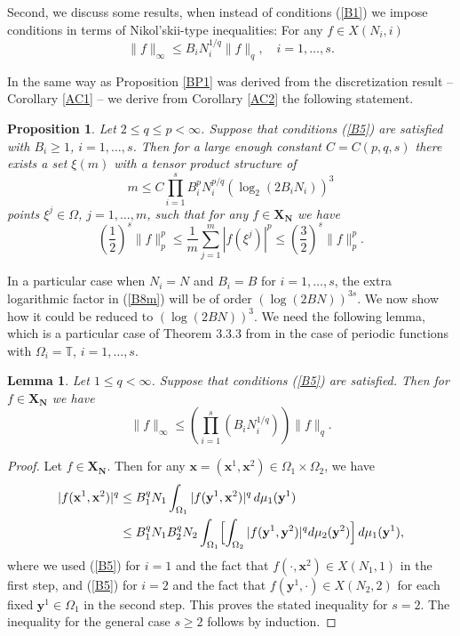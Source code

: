 \documentclass[12pt]{article}
\def \T{\mathbb T}
\def\bx{\mathbf x}
\def\by{\mathbf y}
\def\bN{\mathbf N}
\def\bX{\mathbf X}
\newtheorem{Lemma}{Lemma}[section]
\newtheorem{Proposition}{Proposition}[section]
\numberwithin{equation}{section}
\newcommand{\be}{\begin{equation}}
\newcommand{\ee}{\end{equation}}
\begin{document}
Second, we discuss some results, when instead of conditions (\ref{B1}) we impose conditions in terms of Nikol'skii-type inequalities: For any $f\in X(N_i,i)$
 \be\label{B5}
\|f\|_\infty  \le  B_i N_i^{1/q}\|f\|_q,   \quad i=1,\dots,s.
\ee
 	
In the same way as Proposition \ref{BP1} was derived from the discretization result -- Corollary \ref{AC1} -- we derive from Corollary \ref{AC2} the following statement.

\begin{Proposition}\label{BP2} Let $2\le q \le p<\infty$. Suppose that conditions (\ref{B5}) are satisfied with $B_i\ge 1 $, $i=1,\dots,s$. Then for a  large enough constant $C=C(p,q,s)$ there exists a set $\xi(m)$ with a tensor product structure of
\be\label{B8m}
m \le C \prod_{i=1}^sB_i^{p}N_i^{p/q} (\log_2(2B_i  N_i) )^3
\ee
 points $\xi^j\in \Omega$, $j=1,\dots,m$,   such that for any $f\in \bX_\bN$
we have
\be\label{B9}
\left(\frac{1}{2}\right)^s\|f\|_p^p \le \frac{1}{m}\sum_{j=1}^m |f(\xi^j)|^p \le \left(\frac{3}{2}\right)^s\|f\|_p^p.
\ee
\end{Proposition}	 
	 
In a particular case when $N_i=N$ and $B_i=B$ for  $i=1,\dots,s$, the extra logarithmic factor in (\ref{B8m}) will be of order $(\log(2B  N))^{3s}$. We now show how it could be reduced to 
$(\log (2BN))^{3}$. 
We need the following lemma, which is a particular case of Theorem 3.3.3 from \cite[p.107]{VTbookMA}  in the  case of periodic functions with $\Omega_i = \T$, $i=1,\dots,s$.


\begin{Lemma}\label{BL1} Let $1\le q<\infty$. Suppose that conditions (\ref{B5}) are satisfied. Then for $f\in \bX_\bN$ we have
$$
\|f\|_\infty \le \left(\prod_{i=1}^s (B_iN_i^{1/q})\right)\|f\|_q.
$$
\end{Lemma}
\begin{proof}
 Let $f\in \bX_\bN$.  Then  for any $\bx=(\bx^1, \bx^2) \in\Omega_1\times \Omega_2$, we have 
\begin{align*}
|f(\bx^1, \bx^2)|^q & \leq B_1^q N_1 \int_{\Omega_1} |f(\by^1, \bx^2)|^q\, d\mu_1(\by^1)\\
&\leq  B_1^q N_1 B_2^q N_2  \int_{\Omega_1} \Bigl[ \int_{\Omega_2} |f(\by^1, \by^2)|^qd\mu_2(\by^2) \Bigr]\, d\mu_1(\by^1),
\end{align*}
 where we used  (\ref{B5}) for $i=1$ and  the fact  that $f(\cdot, \bx^2) \in X(N_1, 1)$ in the first step, and  (\ref{B5}) for $i=2$ and  the fact  that $f(\by^1, \cdot) \in X(N_2, 2)$ for each fixed  $\by^1\in\Omega_1$ in the second step.
This proves the stated inequality for $s=2$. The inequality  for  the general case  $s\ge 2$ follows by induction. 

\end{proof}
 
\end{document}
